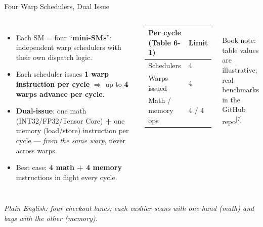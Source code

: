 \documentclass[aspectratio=169]{beamer}
\newcommand{\kw}[1]{\textbf{\textcolor{kwblue}{#1}}}
\newcommand{\pe}[1]{{\footnotesize\itshape Plain English: #1}}
\newcommand{\refmark}[1]{\textsuperscript{[#1]}}
\begin{document}
\begin{frame}{Four Warp Schedulers, Dual Issue}
  \begin{columns}[c]
    \begin{itemize}
      \item Each SM = four ``\kw{mini-SMs}'': independent warp schedulers with their own dispatch logic.
      \item Each scheduler issues \kw{1 warp instruction per cycle} $\Rightarrow$ up to
            \kw{4 warps advance per cycle}.
      \item \kw{Dual-issue}: one math (INT32/FP32/Tensor Core) \kw{+} one memory (load/store)
            instruction per cycle --- \emph{from the same warp}, never across warps.
      \item Best case: \kw{4 math + 4 memory} instructions in flight every cycle.
    \end{itemize}
    \centering
    {\small
    \begin{tabular}{@{}ll@{}}
      \toprule
      \textbf{Per cycle (Table 6-1)} & \textbf{Limit} \\
      \midrule
      Schedulers & 4 \\
      Warps issued & 4 \\
      Math / memory ops & 4 / 4 \\
      \bottomrule
    \end{tabular}}\\[6pt]
    {\scriptsize Book note: table values are illustrative;\\real benchmarks in the GitHub repo\refmark{7}}
  \end{columns}
  \medskip
  \pe{four checkout lanes; each cashier scans with one hand (math) and bags with the other (memory).}
\end{frame}
\end{document}
